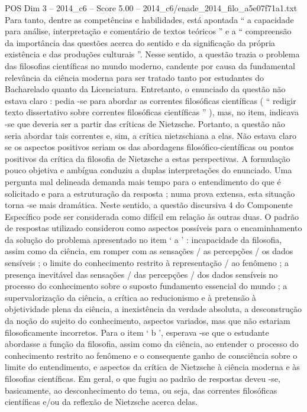 \begin{textsample}{POS Dim 3 – 2014\_c6 – Score 5.00 – 2014\_c6/enade\_2014\_filo\_a5e07f71a1.txt}
Para tanto, dentre as competências e habilidades, está apontada “ a capacidade para análise, interpretação e comentário de textos teóricos ” e a “ compreensão da importância das questões acerca do sentido e da significação da própria existência e das produções culturais ”.
Nesse sentido, a questão trazia o problema das filosofias científicas no mundo moderno, candente por causa da fundamental relevância da ciência moderna para ser tratado tanto por estudantes do Bacharelado quanto da Licenciatura.
Entretanto, o enunciado da questão não estava claro : pedia -se para abordar as correntes filosóficas científicas ( “ redigir texto dissertativo sobre correntes filosóficas científicas ” ), mas, no item, indicava -se que deveria ser a partir das críticas de Nietzsche.
Portanto, a questão não seria abordar tais correntes e, sim, a crítica nietzschiana a elas.
Não estava claro se os aspectos positivos seriam os das abordagens filosófico-científicas ou pontos positivos da crítica da filosofia de Nietzsche a estas perspectivas.
A formulação pouco objetiva e ambígua conduziu a duplas interpretações do enunciado.
Uma pergunta mal delineada demanda mais tempo para o entendimento do que é solicitado e para a estruturação da resposta ; numa prova extensa, esta situação torna -se mais dramática.
Neste sentido, a questão discursiva 4 do Componente Específico pode ser considerada como difícil em relação às outras duas.
O padrão de respostas utilizado considerou como aspectos possíveis para o encaminhamento da solução do problema apresentado no item ‘ a ’ : incapacidade da filosofia, assim como da ciência, em romper com as sensações / as percepções / os dados sensíveis ; o limite do conhecimento restrito à representação / ao fenômeno ; a presença inevitável das sensações / das percepções / dos dados sensíveis no processo do conhecimento sobre o suposto fundamento essencial do mundo ; a supervalorização da ciência, a crítica ao reducionismo e à pretensão à objetividade plena da ciência, a inexistência da verdade absoluta, a desconstrução da noção do sujeito do conhecimento, aspectos variados, mas que não estariam filosoficamente incorretos.
Para o item ‘ b ’, esperava -se que o estudante abordasse a função da filosofia, assim como da ciência, ao entender o processo do conhecimento restrito ao fenômeno e o consequente ganho de consciência sobre o limite do entendimento, e aspectos da crítica de Nietzsche à ciência moderna e às filosofias científicas.
Em geral, o que fugiu ao padrão de respostas deveu -se, basicamente, ao desconhecimento do tema, ou seja, das correntes filosóficas científicas e/ou da reflexão de Nietzsche acerca delas.

\end{textsample}
